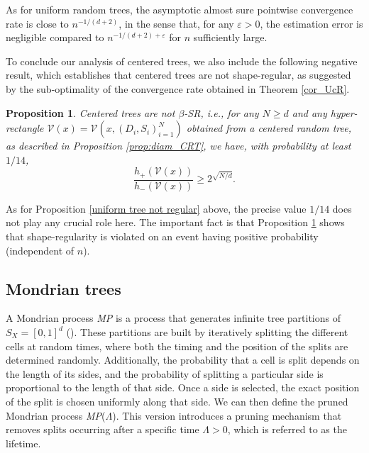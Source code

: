 \documentclass[paper=a4, fontsize=11pt]{scrartcl}
\newtheorem{proposition}[theorem]{Proposition}
\begin{document}
As for uniform random trees, the asymptotic almost sure pointwise convergence rate is close to $n^{-1/(d+2)}$, in the sense that, for any $\varepsilon>0$, the estimation error is negligible compared to $n^{-1/(d+2)+\varepsilon}$ for $n$ sufficiently large.


To conclude our analysis of centered trees, we also include the following negative result, which establishes that centered trees are not shape-regular, as suggested by the sub-optimality of the convergence rate obtained in Theorem \ref{cor_UcR}. 

\begin{proposition}\label{centered tree not regular}
Centered trees are not $\beta$-SR, i.e.,
for any \( N \geq d \) and any hyper-rectangle $\mathcal V (x)= \mathcal V(x, (D_i,S_i)_{i=1}^N)$ obtained from a centered random tree, as described in Proposition \ref{prop:diam_CRT}, we have, with probability at least $1/14$,
$$\dfrac{h_+(\mathcal V (x))}{h_-(\mathcal V (x))} \geq 2^{\sqrt{N/d}}.$$
\end{proposition}
As for Proposition \ref{uniform tree not regular} above, the precise value $1/14$ does not play any crucial role here. The important fact is that Proposition \ref{centered tree not regular} shows that shape-regularity is violated on an event having positive probability (independent of $n$).

\subsection{Mondrian trees}\label{s43}

 A Mondrian process \textit{MP} is a process that generates infinite tree partitions of $S_X = [0,1]^d $ (\cite{mondrianroy2008}). These partitions are built by iteratively splitting the different cells at random times, where both the timing and the position of the splits are determined randomly. Additionally, the probability that a cell is split depends on the length of its sides, and the probability of splitting a particular side is proportional to the length of that side. Once a side is selected, the exact position of the split is chosen uniformly along that side.
We can then define the pruned Mondrian process \textit{MP}($\Lambda$). This version introduces a pruning mechanism that removes splits occurring after a specific time $\Lambda > 0$, which is referred to as the lifetime.
\end{document}
